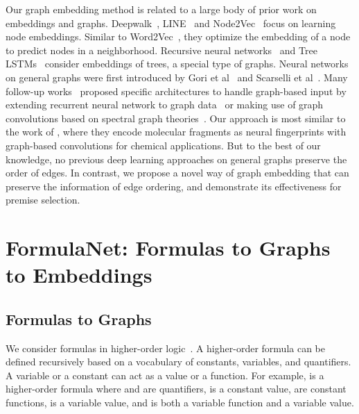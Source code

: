 \documentclass{article}
\begin{document}
Our graph embedding method is related to a large body of
prior work on embeddings and graphs. Deepwalk~\cite{perozzi2014deepwalk}, LINE~\cite{tang2015line} and
Node2Vec~\cite{grover2016node2vec} focus on learning node embeddings. Similar to 
Word2Vec~\cite{mikolov2013distributed,mikolov2013efficient}, they optimize the embedding
of a node to predict nodes in a neighborhood. Recursive neural networks~\cite{goller1996learning, socher2011parsing} and Tree
LSTMs~\cite{tai2015improved} consider embeddings of trees, a special type of graphs.  
Neural networks on general graphs were first introduced by Gori et
al~\cite{gori2005new} and Scarselli et al~\cite{scarselli2009graph}.  Many follow-up
works~\cite{duvenaud2015convolutional, li2015gated, jain2016structural, henaff2015deep, defferrard2016convolutional, kipf2016semi} proposed specific
architectures to handle graph-based input by extending recurrent neural network to graph
data~\cite{gori2005new,li2015gated,jain2016structural} or making use of graph convolutions
based on spectral graph theories~\cite{duvenaud2015convolutional, henaff2015deep,
  defferrard2016convolutional, kipf2016semi, niepert2016learning}. Our approach is most
similar to the work of \cite{duvenaud2015convolutional}, where they encode molecular
fragments as neural fingerprints with graph-based convolutions for chemical applications. 
But to the best of our knowledge, no previous deep learning approaches on general graphs
 preserve the order of edges. In contrast, we propose a novel way of graph embedding that
can preserve the information of edge ordering, and demonstrate its effectiveness for
premise selection. 

\section{FormulaNet: Formulas to Graphs to Embeddings}

\subsection{Formulas to Graphs}

We consider formulas in higher-order logic~\cite{church1940formulation}. A higher-order
formula can be defined recursively based on a vocabulary of constants, variables, and
quantifiers. A variable or a constant can act as a value or a function. For example,
 is a higher-order formula where  and
 are quantifiers,  is a constant value,  are constant
functions,  is a variable value, and  is both a variable function and a
variable value. 
\end{document}
